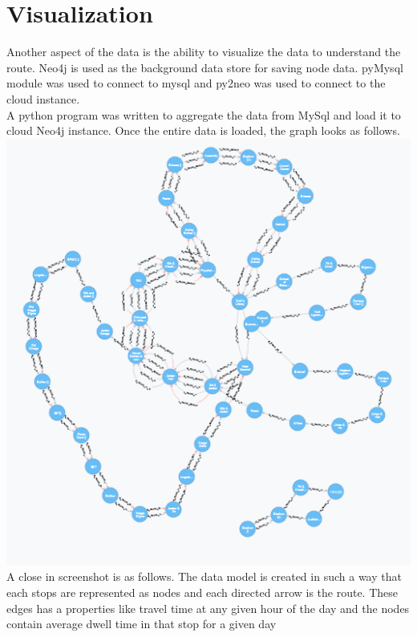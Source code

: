 \documentclass[12pt]{article}
\begin{document}
\section{Visualization}
Another aspect of the data is the ability to visualize the data to understand the route. Neo4j is used as the background data store for saving node data. pyMysql module was used to connect to mysql and py2neo was used to connect to the cloud instance.\\
A python program was written to aggregate the data from MySql and load it to cloud Neo4j instance. Once the entire data is loaded, the graph looks as follows.\\
\includegraphics[scale=1]{resources/neo4j1}\\[1cm] 
A close in screenshot is as follows. The data model is created in such a way that each stops are represented as nodes and each directed arrow is the route. These edges has a properties like travel time at any given hour of the day and the nodes contain average dwell time in that stop for a given day\\
\end{document}
